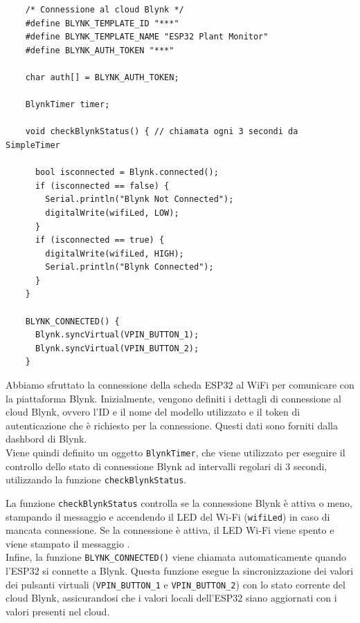 \begin{multicols}{2}
    \begin{verbatim}
    /* Connessione al cloud Blynk */
    #define BLYNK_TEMPLATE_ID "***"
    #define BLYNK_TEMPLATE_NAME "ESP32 Plant Monitor"
    #define BLYNK_AUTH_TOKEN "***"
    
    char auth[] = BLYNK_AUTH_TOKEN;
    
    BlynkTimer timer;
    
    void checkBlynkStatus() { // chiamata ogni 3 secondi da SimpleTimer
    
      bool isconnected = Blynk.connected();
      if (isconnected == false) {
        Serial.println("Blynk Not Connected");
        digitalWrite(wifiLed, LOW);
      }
      if (isconnected == true) {
        digitalWrite(wifiLed, HIGH);
        Serial.println("Blynk Connected");
      }
    }
    
    BLYNK_CONNECTED() {
      Blynk.syncVirtual(VPIN_BUTTON_1);
      Blynk.syncVirtual(VPIN_BUTTON_2);
    }
    \end{verbatim}
    
   \columnbreak
   
Abbiamo sfruttato la connessione della scheda ESP32 al WiFi per comunicare con la piattaforma Blynk. Inizialmente, vengono definiti i dettagli di connessione al cloud Blynk, ovvero l'ID e il nome del modello utilizzato e il token di autenticazione che è richiesto per la connessione. Questi dati sono forniti dalla dashbord di Blynk. \\

Viene quindi definito un oggetto \texttt{BlynkTimer}, che viene utilizzato per eseguire il controllo dello stato di connessione Blynk ad intervalli regolari di 3 secondi, utilizzando la funzione \texttt{checkBlynkStatus}. 
\end{multicols}

La funzione \texttt{checkBlynkStatus} controlla se la connessione Blynk è attiva o meno, stampando il messaggio  e accendendo il LED del Wi-Fi (\texttt{wifiLed}) in caso di mancata connessione. Se la connessione è attiva, il LED Wi-Fi viene spento e viene stampato il messaggio . \\

Infine, la funzione \texttt{BLYNK_CONNECTED()} viene chiamata automaticamente quando l'ESP32 si connette a Blynk. Questa funzione esegue la sincronizzazione dei valori dei pulsanti virtuali (\texttt{VPIN_BUTTON_1} e \texttt{VPIN_BUTTON_2}) con lo stato corrente del cloud Blynk, assicurandosi che i valori locali dell'ESP32 siano aggiornati con i valori presenti nel cloud.

